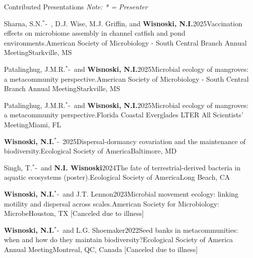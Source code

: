 \documentclass{resume} %
\newcommand{\Star}{\ensuremath{^*}\kern-\scriptspace}
\begin{document}
\begin{rhangSection}{Contributed Presentations}
{\small\em Note: * = Presenter}

\begin{Presentation}{Sharna, S.N.\Star\ , D.J. Wise, M.J. Griffin, and {\bf Wisnoski, N.I.}}{2025}{Vaccination effects on microbiome assembly in channel catfish and pond environments.}{American Society of Microbiology - South Central Branch Annual Meeting}{Starkville, MS}
\end{Presentation}

\begin{Presentation}{Patalinghug, J.M.R.\Star\ and {\bf Wisnoski, N.I.}}{2025}{Microbial ecology of mangroves: a metacommunity perspective.}{American Society of Microbiology - South Central Branch Annual Meeting}{Starkville, MS}
\end{Presentation}

\begin{Presentation}{Patalinghug, J.M.R.\Star\ and {\bf Wisnoski, N.I.}}{2025}{Microbial ecology of mangroves: a metacommunity perspective.}{Florida Coastal Everglades LTER All Scientists' Meeting}{Miami, FL}
\end{Presentation}

\begin{Presentation}{{\bf Wisnoski, N.I.}\Star\ }{2025}{Dispersal-dormancy covariation and the maintenance of biodiversity.}{Ecological Society of America}{Baltimore, MD}
\end{Presentation}

\begin{Presentation}{Singh, T.\Star\ and {\bf N.I. Wisnoski}}{2024}{The fate of terrestrial-derived bacteria in aquatic ecosystems (poster).}{Ecological Society of America}{Long Beach, CA}
\end{Presentation}

\begin{Presentation}{{\bf Wisnoski, N.I.}\Star\ and J.T. Lennon}{2023}{Microbial movement ecology: linking motility and dispersal across scales.}{American Society for Microbiology: Microbe}{Houston, TX [Canceled due to illness]}
\end{Presentation}

\begin{Presentation}{{\bf Wisnoski, N.I.}\Star\ and L.G. Shoemaker}{2022}{Seed banks in metacommunities: when and how do they maintain biodiversity?}{Ecological Society of America Annual Meeting}{Montreal, QC, Canada [Canceled due to illness]}
\end{Presentation}
    

\end{rhangSection}
\end{document}
